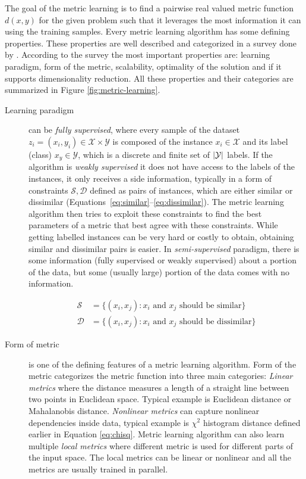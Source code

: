 \documentclass[12pt,a4paper]{report}
\begin{document}
The goal of the metric learning is to find a pairwise real valued metric function $d(x,y)$ for the given problem such that it leverages the most information it can using the training samples. Every metric learning algorithm has some defining properties. These properties are well described and categorized in a survey done by \citep{bellet2013survey}. According to the survey the most important properties are: learning paradigm, form of the metric, scalability, optimality of the solution and if it supports dimensionality reduction. All these properties and their categories are summarized in Figure \ref{fig:metric-learning}.


\begin{description}
\item [Learning paradigm] can be \textit{fully supervised}, where every sample of the dataset $z_i=(x_i,y_i) \in \mathcal{X} \times \mathcal{Y}$ is composed of the instance $x_i \in \mathcal{X}$ and its label (class) $x_y \in \mathcal{Y}$, which is a discrete and finite set of $\left|{\mathcal{Y}}\right|$ labels. If the algorithm is \textit{weakly supervised} it does not have access to the labels of the instances, it only receives a side information, typically in a form of constraints $\mathcal{S}, \mathcal{D}$ defined as pairs of instances, which are either similar or dissimilar (Equations~\ref{eq:similar}--\ref{eq:dissimilar}). The metric learning algorithm then tries to exploit these constraints to find the best parameters of a metric that best agree with these constraints. While getting labelled instances can be very hard or costly to obtain, obtaining similar and dissimilar pairs is easier. In \textit{semi-supervised} paradigm, there is some information (fully supervised or weakly supervised) about a portion of the data, but some (usually large) portion of the data comes with no information.

\begin{align}
\mathcal{S} &= \lbrace(x_i,x_j): x_i \text{ and } x_j \text{ should be similar} \rbrace \label{eq:similar} \\
\mathcal{D} &= \lbrace(x_i,x_j): x_i \text{ and } x_j \text{ should be dissimilar} \rbrace \label{eq:dissimilar}
\end{align}

\item [Form of metric] is one of the defining features of a metric learning algorithm. Form of the metric categorizes the metric function into three main categories: \textit{Linear metrics} where the distance measures a length of a straight line between two points in Euclidean space. Typical example is Euclidean distance or Mahalanobis distance. \textit{Nonlinear metrics} can capture nonlinear dependencies inside data, typical example is $\chi^2$ histogram distance defined earlier in Equation \ref{eq:chisq}. Metric learning algorithm can also learn multiple \textit{local metrics} where different metric is used for different parts of the input space. The local metrics can be linear or nonlinear and all the metrics are usually trained in parallel.


\end{description}
\end{document}
